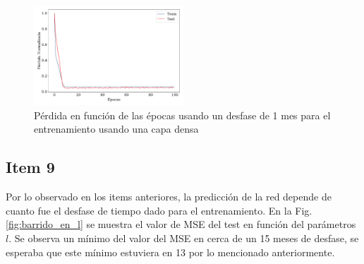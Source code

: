 \begin{figure}[H]
	\begin{small}
		\begin{center}
			\includegraphics[width=0.5\textwidth]{prediccion_l-1_dense_loss.pdf}
		\end{center}
		\caption{Pérdida en función de las épocas usando un desfase de 1 mes para el entrenamiento usando una capa densa}
		\label{fig:l-1-Densa}
	\end{small}
\end{figure}


\subsection*{Item 9}

Por lo observado en los items anteriores, la predicción de la red depende de cuanto fue el desfase de tiempo dado para el entrenamiento. En la Fig.\,\ref{fig:barrido_en_l} se muestra el valor de MSE del test en función del parámetros $l$. Se observa un mínimo del valor del MSE en cerca de un 15  meses de desfase, se esperaba que este mínimo estuviera en 13 por lo mencionado anteriormente. 

